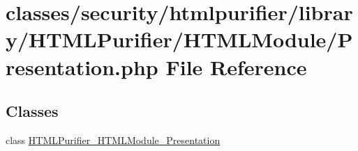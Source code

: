 \hypertarget{Presentation_8php}{\section{classes/security/htmlpurifier/library/\+H\+T\+M\+L\+Purifier/\+H\+T\+M\+L\+Module/\+Presentation.php File Reference}
\label{Presentation_8php}
}
\subsection*{Classes}
\begin{DoxyCompactItemize}
\item 
class \hyperlink{classHTMLPurifier__HTMLModule__Presentation}{H\+T\+M\+L\+Purifier\+\_\+\+H\+T\+M\+L\+Module\+\_\+\+Presentation}
\end{DoxyCompactItemize}

